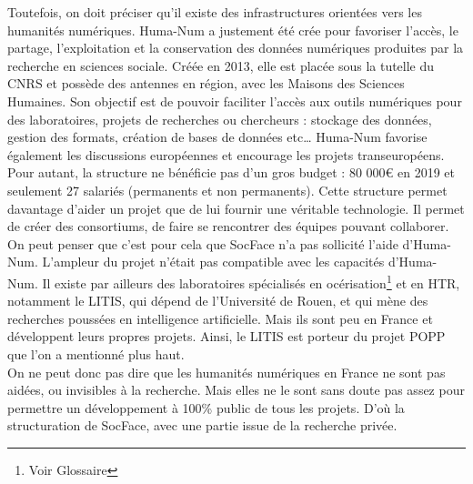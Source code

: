 Toutefois, on doit préciser qu’il existe des infrastructures orientées vers les humanités numériques. Huma-Num a justement été crée pour favoriser l’accès, le partage, l’exploitation et la conservation des données numériques produites par la recherche en sciences sociale. Créée en 2013, elle est placée sous la tutelle du CNRS et possède des antennes en région, avec les Maisons des Sciences Humaines. Son objectif est de pouvoir faciliter l’accès aux outils numériques pour des laboratoires, projets de recherches ou chercheurs : stockage des données, gestion des formats, création de bases de données etc… Huma-Num favorise également les discussions européennes et encourage les projets transeuropéens. Pour autant, la structure ne bénéficie pas d’un gros budget : 80 000€ en 2019 et seulement 27 salariés (permanents et non permanents). Cette structure permet davantage d’aider un projet que de lui fournir une véritable technologie. Il permet de créer des consortiums, de faire se rencontrer des équipes pouvant collaborer. On peut penser que c’est pour cela que SocFace n’a pas sollicité l’aide d’Huma-Num. L’ampleur du projet n’était pas compatible avec les capacités d’Huma-Num. Il existe par ailleurs des laboratoires spécialisés en \gls{océrisation}\footnote{Voir Glossaire} et en \gls{HTR}, notamment le LITIS, qui dépend de l’Université de Rouen, et qui mène des recherches poussées en intelligence artificielle. Mais ils sont peu en France et développent leurs propres projets. Ainsi, le LITIS est porteur du projet POPP que l’on a mentionné plus haut.\\
	
On ne peut donc pas dire que les humanités numériques en France ne sont pas aidées, ou invisibles à la recherche. Mais elles ne le sont sans doute pas assez pour permettre un développement à 100\% public de tous les projets. D’où la structuration de SocFace, avec une partie issue de la recherche privée. 




